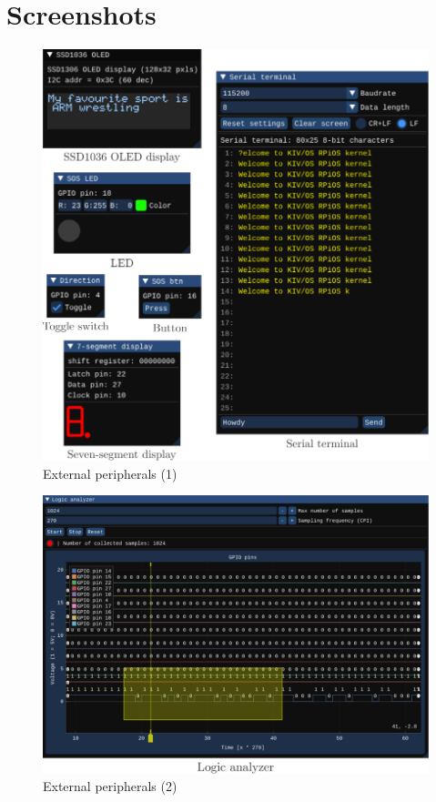 \documentclass[english, ing, kiv, he, iso690numb, pdf]{fasthesis}
\begin{document}
	\null
	\vfill
	
	\newpage
	
	\section{Screenshots}
	
	\null
	\vfill
	
	\begin{figure}[ht]
		\centering
		\includegraphics[width=1.0\textwidth]{img/attachments/external_peripherals_1.pdf}
		\caption{External peripherals (1)}
		\label{External peripherals (1)}
	\end{figure}
	
	\null
	\vfill
	
	\newpage
	
	\null
	\vfill
	
	\begin{figure}[ht]
		\centering
		\includegraphics[width=1.0\textwidth]{img/attachments/external_peripherals_2.pdf}
		\caption{External peripherals (2)}
		\label{External peripherals (2)}
	\end{figure}
	
\end{document}
